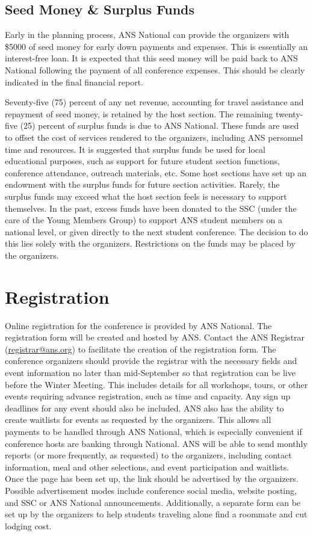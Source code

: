 \documentclass[12pt]{article}
\begin{document}
\subsection{Seed Money \& Surplus Funds}
Early in the planning process, ANS National can provide the organizers with \$5000 of seed money for early down payments and expenses.
This is essentially an interest-free loan.
It is expected that this seed money will be paid back to ANS National following the payment of all conference expenses.
This should be clearly indicated in the final financial report.

Seventy-five (75) percent of any net revenue, accounting for travel assistance and repayment of seed money, is retained by the host section.
The remaining twenty-five (25) percent of surplus funds is due to ANS National.
These funds are used to offset the cost of services rendered to the organizers, 
including ANS personnel time and resources.
It is suggested that surplus funds be used for local educational purposes, such as support for future student section functions, conference attendance, outreach materials, etc.
Some host sections have set up an endowment with the surplus funds for future section activities.
Rarely, the surplus funds may exceed what the host section feels is necessary to support themselves.
In the past, excess funds have been donated to the SSC (under the care of the Young Members Group) to support ANS student members on a national level, or given directly to the next student conference.
The decision to do this lies solely with the organizers.
Restrictions on the funds may be placed by the organizers.

\clearpage
\section{Registration}
Online registration for the conference is provided by ANS National.
The registration form will be created and hosted by ANS.
Contact the ANS Registrar (\href{mailto:registrar@ans.org}{registrar@ans.org}) to facilitate the creation of the registration form.
The conference organizers should provide the registrar with the necessary fields and event information no later than mid-September so that registration can be live before the Winter Meeting.
This includes details for all workshops, tours, or other events requiring advance registration, such as time and capacity.
Any sign up deadlines for any event should also be included.
ANS also has the ability to create waitlists for events as requested by the organizers.
This allows all payments to be handled through ANS National, which is especially convenient if conference hosts are banking through National.
ANS will be able to send monthly reports (or more frequently, as requested) to the organizers, including contact information, meal and other selections, and event participation and waitlists.
Once the page has been set up, the link should be advertised by the organizers.
Possible advertisement modes include conference social media, website posting, and SSC or ANS National announcements.
Additionally, a separate form can be set up by the organizers to help students traveling alone find a roommate and cut lodging cost.
\end{document}

